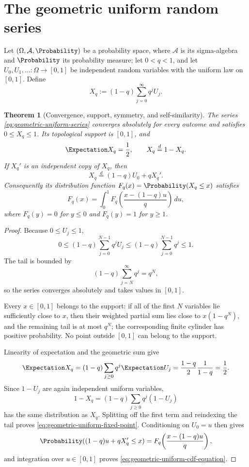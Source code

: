 \documentclass[11pt,a4paper,oneside,openany]{book}
\newtheorem{theorem}{Theorem}[chapter]
\theoremstyle{definition}
\theoremstyle{remark}
\begin{document}
\section{The geometric uniform random series}

Let $(\Omega,\mathcal A,\Probability)$ be a probability space, where
\(\mathcal A\) is its sigma-algebra and \(\Probability\) its probability measure; let $0<q<1$,
and let $U_0,U_1,\ldots:\Omega\to[0,1]$ be independent random variables with
the uniform law on $[0,1]$.  Define
\begin{equation}\label{eq:geometric-uniform-series}
 X_q:=(1-q)\sum_{j=0}^{\infty}q^jU_j.
\end{equation}

\begin{theorem}[Convergence, support, symmetry, and self-similarity]\label{thm:geometric-uniform-basic}
The series \eqref{eq:geometric-uniform-series} converges absolutely for every outcome and satisfies $0\le X_q\le1$.  Its topological support is $[0,1]$, and
\begin{equation}\label{eq:geometric-uniform-mean-symmetry}
 \Expectation X_q=\frac12,
 \qquad
 X_q\overset{d}=1-X_q.
\end{equation}
If $X_q'$ is an independent copy of $X_q$, then
\begin{equation}\label{eq:geometric-uniform-fixed-point}
 X_q\overset{d}=(1-q)U_0+qX_q'.
\end{equation}
Consequently its distribution function $F_q(x)=\Probability(X_q\le x)$ satisfies
\begin{equation}\label{eq:geometric-uniform-cdf-equation}
 F_q(x)=\int_0^1
 F_q\!\left(\frac{x-(1-q)u}{q}\right)\,du,
\end{equation}
where $F_q(y)=0$ for $y\le0$ and $F_q(y)=1$ for $y\ge1$.
\end{theorem}

\begin{proof}
Because $0\le U_j\le1$,
\[
 0\le (1-q)\sum_{j=0}^{N-1}q^jU_j
 \le(1-q)\sum_{j=0}^{N-1}q^j\le1.
\]
The tail is bounded by
\[
 (1-q)\sum_{j=N}^{\infty}q^j=q^N,
\]
so the series converges absolutely and takes values in $[0,1]$.

Every $x\in[0,1]$ belongs to the support: if all of the first $N$ variables lie sufficiently close to $x$, then their weighted partial sum lies close to $x(1-q^N)$, and the remaining tail is at most $q^N$; the corresponding finite cylinder has positive probability.  No point outside $[0,1]$ can belong to the support.

Linearity of expectation and the geometric sum give
\[
 \Expectation X_q=(1-q)\sum_{j\ge0}q^j\Expectation U_j
 =\frac{1-q}{2}\frac1{1-q}=\frac12.
\]
Since $1-U_j$ are again independent uniform variables,
\[
 1-X_q=(1-q)\sum_{j\ge0}q^j(1-U_j)
\]
has the same distribution as $X_q$.  Splitting off the first term and reindexing the tail proves \eqref{eq:geometric-uniform-fixed-point}.  Conditioning on $U_0=u$ then gives
\[
 \Probability((1-q)u+qX_q'\le x)
 =F_q\!\left(\frac{x-(1-q)u}{q}\right),
\]
and integration over $u\in[0,1]$ proves \eqref{eq:geometric-uniform-cdf-equation}.
\end{proof}
\end{document}
